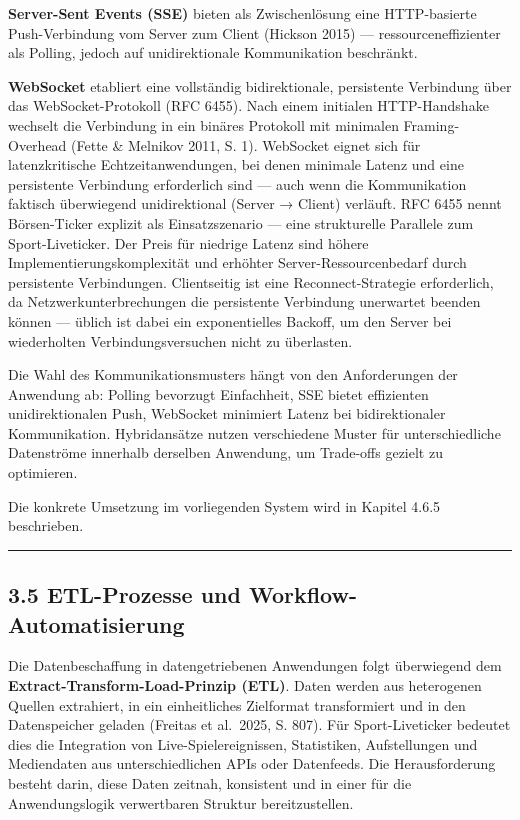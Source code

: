 \textbf{Server-Sent Events (SSE)} bieten als Zwischenlösung eine
HTTP-basierte Push-Verbindung vom Server zum Client (Hickson 2015) ---
ressourceneffizienter als Polling, jedoch auf unidirektionale
Kommunikation beschränkt.

\textbf{WebSocket} etabliert eine vollständig bidirektionale,
persistente Verbindung über das WebSocket-Protokoll (RFC 6455). Nach
einem initialen HTTP-Handshake wechselt die Verbindung in ein binäres
Protokoll mit minimalen Framing-Overhead (Fette \& Melnikov 2011, S. 1).
WebSocket eignet sich für latenzkritische Echtzeitanwendungen, bei denen
minimale Latenz und eine persistente Verbindung erforderlich sind ---
auch wenn die Kommunikation faktisch überwiegend unidirektional (Server
→ Client) verläuft. RFC 6455 nennt Börsen-Ticker explizit als
Einsatzszenario --- eine strukturelle Parallele zum Sport-Liveticker.
Der Preis für niedrige Latenz sind höhere Implementierungskomplexität
und erhöhter Server-Ressourcenbedarf durch persistente Verbindungen.
Clientseitig ist eine Reconnect-Strategie erforderlich, da
Netzwerkunterbrechungen die persistente Verbindung unerwartet beenden
können --- üblich ist dabei ein exponentielles Backoff, um den Server
bei wiederholten Verbindungsversuchen nicht zu überlasten.

Die Wahl des Kommunikationsmusters hängt von den Anforderungen der
Anwendung ab: Polling bevorzugt Einfachheit, SSE bietet effizienten
unidirektionalen Push, WebSocket minimiert Latenz bei bidirektionaler
Kommunikation. Hybridansätze nutzen verschiedene Muster für
unterschiedliche Datenströme innerhalb derselben Anwendung, um
Trade-offs gezielt zu optimieren.

Die konkrete Umsetzung im vorliegenden System wird in Kapitel 4.6.5
beschrieben.

\begin{center}\rule{0.5\linewidth}{0.5pt}\end{center}

\subsection{3.5 ETL-Prozesse und
Workflow-Automatisierung}\label{etl-prozesse-und-workflow-automatisierung}

Die Datenbeschaffung in datengetriebenen Anwendungen folgt überwiegend
dem \textbf{Extract-Transform-Load-Prinzip (ETL)}. Daten werden aus
heterogenen Quellen extrahiert, in ein einheitliches Zielformat
transformiert und in den Datenspeicher geladen (Freitas et al.~2025, S.
807). Für Sport-Liveticker bedeutet dies die Integration von
Live-Spielereignissen, Statistiken, Aufstellungen und Mediendaten aus
unterschiedlichen APIs oder Datenfeeds. Die Herausforderung besteht
darin, diese Daten zeitnah, konsistent und in einer für die
Anwendungslogik verwertbaren Struktur bereitzustellen.

